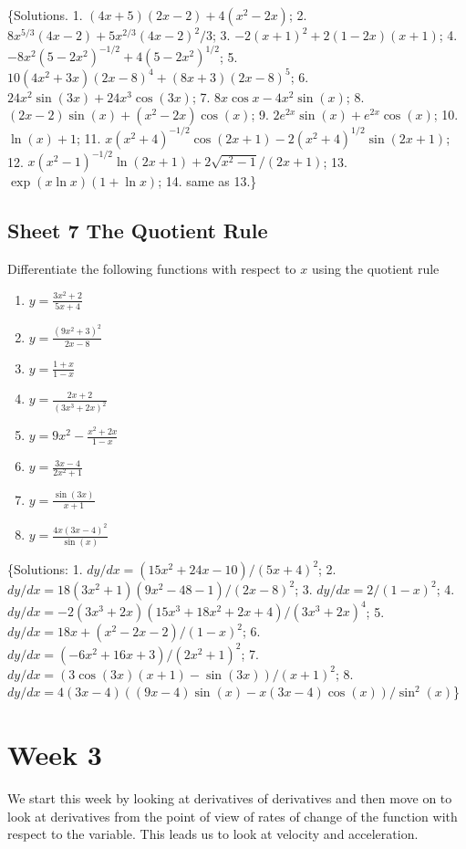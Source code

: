 \documentclass[
  11pt,
  oneside]{book}
\providecommand{\tightlist}{%
  \setlength{\itemsep}{0pt}\setlength{\parskip}{0pt}}
\newcommand{\slide}{}
\theoremstyle{definition}
\theoremstyle{definition}
\theoremstyle{definition}
\theoremstyle{definition}
\theoremstyle{remark}
\begin{document}
\slide

\{Solutions. 1. \((4x+5)(2x-2)+4(x^2-2x)\); 2. \(8x^{5/3}(4x-2)+5x^{2/3}(4x-2)^2/3\); 3. \(-2(x+1)^2+2(1-2x)(x+1)\); 4. \(-8x^2(5-2x^2)^{-1/2}+4(5-2x^2)^{1/2}\); 5. \(10(4x^2+3x)(2x-8)^4+(8x+3)(2x-8)^5\); 6. \(24x^2\sin(3x)+24x^3\cos(3x)\); 7. \(8x\cos x-4x^2\sin(x)\); 8. \((2x-2)\sin(x)+(x^2-2x)\cos(x)\); 9. \(2e^{2x}\sin(x)+e^{2x}\cos(x)\); 10. \(\ln(x)+1\); 11. \(x(x^2+4)^{-1/2}\cos(2x+1)-2(x^2+4)^{1/2}\sin(2x+1)\); 12. \(x(x^2-1)^{-1/2}\ln(2x+1)+2\sqrt{x^2-1}/(2x+1)\); 13. \(\exp(x\ln x)(1+\ln x)\); 14. same as 13.\}
\slide

\section{Sheet 7 The Quotient Rule}\label{sheet-7-the-quotient-rule}

Differentiate the following functions with respect to \(x\) using the quotient rule

\begin{enumerate}
\def\labelenumi{\arabic{enumi}.}
\tightlist
\item
  \(y=\frac{3x^2+2}{5x+4}\)
\item
  \(y=\frac{(9x^2+3)^2}{2x-8}\)
\item
  \(y=\frac{1+x}{1-x}\)
\item
  \(y=\frac{2x+2}{(3x^3+2x)^2}\)
\item
  \(y=9x^2-\frac{x^2+2x}{1-x}\)
\item
  \(y=\frac{3x-4}{2x^2+1}\)
\item
  \(y=\frac{\sin(3x)}{x+1}\)
\item
  \(y=\frac{4x(3x-4)^2}{\sin(x)}\)
\end{enumerate}

\slide

\{Solutions: 1. \(dy/dx = (15x^2+24x-10)/(5x+4)^2\); 2. \(dy/dx = 18(3x^2+1)(9x^2-48-1)/(2x-8)^2\); 3. \(dy/dx = 2/(1-x)^2\); 4. \(dy/dx = -2(3x^3+2x)(15x^3+18x^2+2x+4)/(3x^3+2x)^4\); 5. \(dy/dx = 18x+(x^2-2x-2)/(1-x)^2\); 6. \(dy/dx = (-6x^2+16x+3)/(2x^2+1)^2\); 7. \(dy/dx = (3\cos(3x)(x+1)-\sin(3x))/(x+1)^2\); 8. \(dy/dx = 4(3x-4)((9x-4)\sin(x)-x(3x-4)\cos(x))/\sin^2(x)\)\}

\chapter{Week 3}\label{week-three}

We start this week by looking at derivatives of derivatives and then move on to look at derivatives from the point of view of rates of change of the function with respect to the variable. This leads us to look at velocity and acceleration.
\slide
\end{document}
